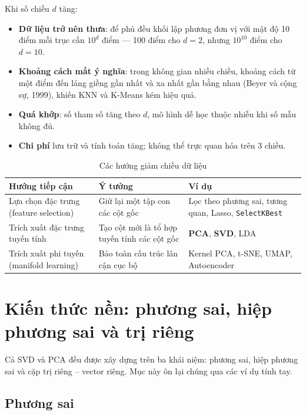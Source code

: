 Khi số chiều $d$ tăng:
\begin{itemize}
    \item \textbf{Dữ liệu trở nên thưa}: để phủ đều khối lập phương đơn vị với mật độ 10 điểm mỗi trục cần $10^d$ điểm --- 100 điểm cho $d = 2$, nhưng $10^{10}$ điểm cho $d = 10$.
    \item \textbf{Khoảng cách mất ý nghĩa}: trong không gian nhiều chiều, khoảng cách từ một điểm đến láng giềng gần nhất và xa nhất gần bằng nhau (Beyer và cộng sự, 1999), khiến KNN và K-Means kém hiệu quả.
    \item \textbf{Quá khớp}: số tham số tăng theo $d$, mô hình dễ học thuộc nhiễu khi số mẫu không đủ.
    \item \textbf{Chi phí} lưu trữ và tính toán tăng; không thể trực quan hóa trên 3 chiều.
\end{itemize}

\begin{table}[H]
\centering
\begin{tabular}{|p{3.6cm}|p{5.2cm}|p{4.2cm}|}
\hline
\textbf{Hướng tiếp cận} & \textbf{Ý tưởng} & \textbf{Ví dụ} \\
\hline
Lựa chọn đặc trưng (feature selection) & Giữ lại một tập con các cột gốc & Lọc theo phương sai, tương quan, Lasso, \texttt{SelectKBest} \\ \hline
Trích xuất đặc trưng tuyến tính & Tạo cột mới là tổ hợp tuyến tính các cột gốc & \textbf{PCA}, \textbf{SVD}, LDA \\ \hline
Trích xuất phi tuyến (manifold learning) & Bảo toàn cấu trúc lân cận cục bộ & Kernel PCA, t-SNE, UMAP, Autoencoder \\ \hline
\end{tabular}
\caption{Các hướng giảm chiều dữ liệu}
\end{table}

\section{Kiến thức nền: phương sai, hiệp phương sai và trị riêng}
\label{sec:linalg-review}

Cả SVD và PCA đều được xây dựng trên ba khái niệm: phương sai, hiệp phương sai và cặp trị riêng -- vector riêng. Mục này ôn lại chúng qua các ví dụ tính tay.

\subsection{Phương sai}

